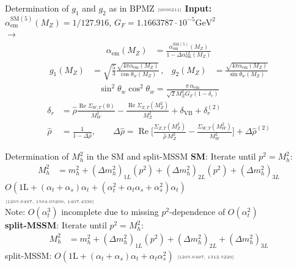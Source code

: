 \documentclass[hyperref={pdfpagelabels=false},ngerman]{beamer}
\newcommand{\mycite}[1]{\ensuremath{\text{\textcolor{darkgray}{\tiny [#1]}}}}
\DeclareMathOperator{\re}{Re}
\renewcommand{\emph}{\textbf}
\newcommand{\SM}{\ensuremath{\text{SM}}}
\newcommand{\at}{\alpha_t}
\newcommand{\as}{\alpha_s}
\newcommand{\aem}{\alpha_\text{em}}
\begin{document}
\begin{frame}[noframenumbering]{Determination of $g_1$ and $g_2$ as in BPMZ \mycite{9606211}}
  \emph{Input:} \ \ $\aem^{\SM(5)}(M_Z) = 1/127.916$, $G_F = 1.1663787\cdot 10^{-5}\text{GeV}^2$\\[1em]
  $\rightarrow$
  \begin{align*}
  \aem(M_Z) &=
  \frac{\aem^{\SM(5)}(M_Z)}{1 - \Delta\aem^{1L}(M_Z)} 
  \end{align*}
  \begin{align*}
    g_1(M_Z) &= \sqrt{\frac{5}{3}} \frac{\sqrt{4\pi\aem(M_Z)}}{\cos\theta_w(M_Z)} \,, &
    g_2(M_Z) &= \frac{\sqrt{4\pi\aem(M_Z)}}{\sin\theta_w(M_Z)}
  \end{align*}
  \begin{align*}
  \sin^2\theta_w \cos^2\theta_w =
  \frac{\pi\,\aem}{\sqrt{2} M_Z^2 G_F (1-\delta_r)}
  \end{align*}
  \begin{align*}
    \delta_r &= \hat\rho \frac{\re\Sigma_{W,T}(0)}{M_W^2} -
    \frac{\re\Sigma_{Z,T}(M_Z^2)}{M_Z^2} + \delta_{\text{VB}} + \delta_r^{(2)} \\
    \hat\rho &= \frac{1}{1-\Delta\hat\rho} , \qquad \Delta\hat\rho
    = \re\Biggl[ \frac{\Sigma_{Z,T}(M_Z^2)}{\hat\rho\,M_Z^2} -
    \frac{\Sigma_{W,T}(M_W^2)}{M_W^2}\Biggr] + \Delta\hat\rho^{(2)}
  \end{align*}
\end{frame}

\begin{frame}[noframenumbering]{Determination of $M_h^2$ in the SM and split-MSSM}
  \emph{SM}:
  Iterate until $p^2 = M_h^2$:
  \begin{align*}
    M_h^2 &= m_h^2 + (\Delta m_h^2)_{1L}(p^2)
            + (\Delta m_h^2)_{2L}(p^2) +(\Delta m_h^2)_{3L}
  \end{align*}
  $O(\text{1L} + (\at+\as)\at + (\at^2 + \at\as + \as^2)\at)$\\
  \mycite{1205.6497, 1504.05200, 1407.4336}\\
  Note: $O(\at^3)$ incomplete due to missing $p^2$-dependence of $O(\at^2)$
  \\[2em]
  \emph{split-MSSM}:
  Iterate until $p^2 = M_h^2$:
  \begin{align*}
    M_h^2 &= m_h^2 + (\Delta m_h^2)_{1L}(p^2)
            + (\Delta m_h^2)_{2L} +(\Delta m_h^2)_{3L}
  \end{align*}
  split-MSSM: $O(\text{1L} + (\at+\as)\at + \at\as^2)$
  \mycite{1205.6497, 1312.5220}
\end{frame}
\end{document}
